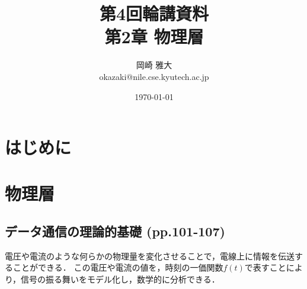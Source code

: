 \documentclass[a4paper]{ltjsarticle}
\title{第4回輪講資料 \\ 第2章 物理層}
\author{岡崎 雅大 \\ okazaki@nile.cse.kyutech.ac.jp}
\date{\today}
\begin{document}
\maketitle
\tableofcontents

\section{はじめに}

\section{物理層}
	\subsection{データ通信の理論的基礎 (pp.101-107)}
		電圧や電流のような何らかの物理量を変化させることで，電線上に情報を伝送することができる．
		この電圧や電流の値を，時刻の一価関数$f(t)$で表すことにより，信号の振る舞いをモデル化し，数学的に分析できる．
\end{document}
